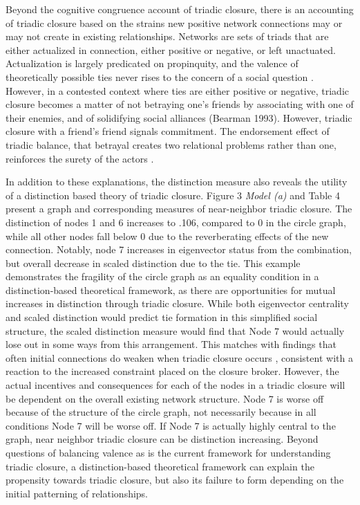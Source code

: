 \documentclass[12pt]{article}
\begin{document}
Beyond the cognitive congruence account of triadic closure, there is an accounting of triadic closure based on the strains new positive network connections may or may not create in existing relationships. Networks are sets of triads that are either actualized in connection, either positive or negative, or left unactuated. Actualization is largely predicated on propinquity, and the valence of theoretically possible ties never rises to the concern of a social question \citep{feld1981focused, feld1982social, mollenhorst2011shared}. However, in a contested context where ties are either positive or negative, triadic closure becomes a matter of not betraying one's friends by associating with one of their enemies, and of solidifying social alliances (Bearman 1993). However, triadic closure with a friend's friend signals commitment. The endorsement effect of triadic balance, that betrayal creates two relational problems rather than one, reinforces the surety of the actors \citep{yoon2013exchange}. 

In addition to these explanations, the distinction measure also reveals the utility of a distinction based theory of triadic closure. Figure 3 \textit{Model (a)} and Table 4 present a graph and corresponding measures of near-neighbor triadic closure. The distinction of nodes 1 and 6 increases to .106, compared to 0 in the circle graph, while all other nodes fall below 0 due to the reverberating effects of the new connection. Notably, node 7 increases in eigenvector status from the combination, but overall decrease in scaled distinction due to the tie. This example demonstrates the fragility of the circle graph as an equality condition in a distinction-based theoretical framework, as there are opportunities for mutual increases in distinction through triadic closure. While both eigenvector centrality and scaled distinction would predict tie formation in this simplified social structure, the scaled distinction measure would find that Node 7 would actually lose out in some ways from this arrangement. This matches with findings that often initial connections do weaken when triadic closure occurs \citep{huang2018will}, consistent with a reaction to the increased constraint placed on the closure broker. However, the actual incentives and consequences for each of the nodes in a triadic closure will be dependent on the overall existing network structure. Node 7 is worse off because of the structure of the circle graph, not necessarily because in all conditions Node 7 will be worse off. If Node 7 is actually highly central to the graph, near neighbor triadic closure can be distinction increasing. Beyond questions of balancing valence as is the current framework for understanding triadic closure, a distinction-based theoretical framework can explain the propensity towards triadic closure, but also its failure to form depending on the initial patterning of relationships. 
\end{document}
